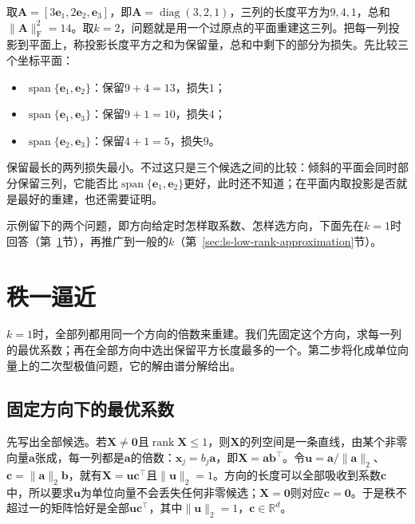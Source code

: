 \begin{example}[三个坐标向量的重建]
\label{ex:ls-low-rank-three-columns}
取$\bm A=[3\bm e_1,2\bm e_2,\bm e_3]$，即$\bm A=\operatorname{diag}(3,2,1)$，三列的长度平方为$9,4,1$，总和$\lVert\bm A\rVert_{\mathrm F}^2=14$。取$k=2$，问题就是用一个过原点的平面重建这三列。把每一列投影到平面上，称投影长度平方之和为保留量，总和中剩下的部分为损失。先比较三个坐标平面：
\begin{itemize}
 \item $\operatorname{span}\{\bm e_1,\bm e_2\}$：保留$9+4=13$，损失$1$；
 \item $\operatorname{span}\{\bm e_1,\bm e_3\}$：保留$9+1=10$，损失$4$；
 \item $\operatorname{span}\{\bm e_2,\bm e_3\}$：保留$4+1=5$，损失$9$。
\end{itemize}
保留最长的两列损失最小。不过这只是三个候选之间的比较：倾斜的平面会同时部分保留三列，它能否比$\operatorname{span}\{\bm e_1,\bm e_2\}$更好，此时还不知道；在平面内取投影是否就是最好的重建，也还需要证明。
\end{example}

示例留下的两个问题，即方向给定时怎样取系数、怎样选方向，下面先在$k=1$时回答（第~\ref{sec:ls-rank-one-rayleigh}节），再推广到一般的$k$（第~\ref{sec:ls-low-rank-approximation}节）。

\section{秩一逼近}
\label{sec:ls-rank-one-rayleigh}

$k=1$时，全部列都用同一个方向的倍数来重建。我们先固定这个方向，求每一列的最优系数；再在全部方向中选出保留平方长度最多的一个。第二步将化成单位向量上的二次型极值问题，它的解由谱分解给出。

\subsection{固定方向下的最优系数}
\label{sec:matrix-approximation-rank-one-coefficients}

先写出全部候选。若$\bm X\neq\bm0$且$\operatorname{rank}\bm X\leq1$，则$\bm X$的列空间是一条直线，由某个非零向量$\bm a$张成，每一列都是$\bm a$的倍数：$\bm x_j=b_j\bm a$，即$\bm X=\bm a\bm b^\top$。令$\bm u=\bm a/\lVert\bm a\rVert_2$、$\bm c=\lVert\bm a\rVert_2\bm b$，就有$\bm X=\bm u\bm c^\top$且$\lVert\bm u\rVert_2=1$。方向的长度可以全部吸收到系数$\bm c$中，所以要求$\bm u$为单位向量不会丢失任何非零候选；$\bm X=\bm0$则对应$\bm c=\bm0$。于是秩不超过一的矩阵恰好是全部$\bm u\bm c^\top$，其中$\lVert\bm u\rVert_2=1$，$\bm c\in\mathbb R^d$。

